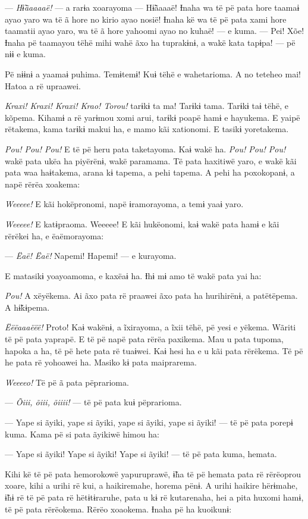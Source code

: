 --- \textit{Hɨ̃ãaaaaë! }--- a rarɨa xoarayoma --- Hɨ̃ãaaaë! Ɨnaha wa të pë pata
hore taamaɨ ayao yaro wa të ã hore no kirio ayao nosië! Ɨnaha kë wa të
pë pata xami hore taamatii ayao yaro, wa të ã hore yahoomi ayao no
kuhaë! --- e kuma. --- Pei! Xõe! Ɨnaha pë taamayou tëhë mihi wahë ãxo ha
tuprakɨnɨ, a wakë kata tapɨpa! --- pë nɨɨ e kuma. 

Pë nɨɨnɨ a yaamaɨ puhima. Temɨtemɨ! Kuɨ tëhë e wahetarioma. A no teteheo
mai! Hatoa a rë upraawei. 

\textit{Kraxi! Kraxi! Kraxi! Krao! Torou!} tarɨkɨ ta ma! Tarɨkɨ tama. Tarɨkɨ taɨ
tëhë, e kõpema. Kihamɨ a rë yarɨmou xomi arui, tarɨkɨ poapë hamɨ e
hayukema. E yaipë rëtakema, kama tarɨkɨ makui ha, e mamo kãi xationomi.
E tasikɨ yoretakema. 

\textit{Pou! Pou! Pou!} E të pë heru pata taketayoma. Kaɨ wakë ha. \textit{Pou! Pou! Pou!}
wakë pata ukëa ha piyërënɨ, wakë paramama. Të pata haxitiwë yaro, e wakë
kãi pata waa haɨtakema, arana kɨ tapema, a pehi tapema. A pehi ha
poxokopanɨ, a napë rërëa xoakema:

\textit{Weeeee!} E kãi hokëpronomi, napë ɨramorayoma, a temɨ yaaɨ yaro. 

\textit{Weeeee!} E katɨpraoma. Weeeee! E kãi hukëonomi, kaɨ wakë pata hamɨ e kãi
rërëkei ha, e ëaëmorayoma:

--- \textit{Ëaë! Ëaë!} Napemi! Hapemi! --- e kurayoma. 

E matasikɨ yoayoamoma, e kaxëaɨ ha. Ɨhɨ mɨ amo të wakë pata yai ha: 

\textit{Pou!} A xëyëkema. Ai ãxo pata rë praawei ãxo pata ha hurihirënɨ, a
patëtëpema. A hɨ̃kɨpema. 

\textit{Ëëëaaaëëë!} Proto! Kaɨ wakënɨ, a ĩxirayoma, a ĩxii tëhë, pë yesi e
yëkema. Wãriti të pë pata yaprapë. E të pë napë pata rërëa paxikema. Mau
u pata tupoma, hapoka a ha, të pë hete pata rë tuaɨwei. Kaɨ hesi ha e u
kãi pata rërëkema. Të pë he pata rë yohoawei ha. Masiko kɨ pata
maiprarema. 

\textit{Weeeeo!} Të pë ã pata pëprarioma. 

--- \textit{Õiii, õiii, õiiii!} --- të pë pata kuɨ pëprarioma.

--- Yape si ãyiki, yape si ãyiki, yape si ãyiki, yape si ãyiki! --- të
pë pata porepɨ kuma. Kama pë si pata ãyikiwë himou ha: 

--- Yape si ãyiki! Yape si ãyiki! Yape si ãyiki! --- të pë pata kuma,
hemata. 

Kihi kë të pë pata hemorokowë yapuruprawë, ɨ̃ha të pë hemata pata rë
rërëoprou xoare, kihi a urihi rë kui, a haikiremahe, horema pënɨ. A urihi haikire hërɨmahe, ɨ̃hɨ rë të pë pata rë hëtɨtɨraruhe, pata u kɨ rë
kutarenaha, hei a pita huxomi hamɨ, të pë pata rërëokema. Rërëo
xoaokema. Ɨnaha pë ha kuoikunɨ: 


